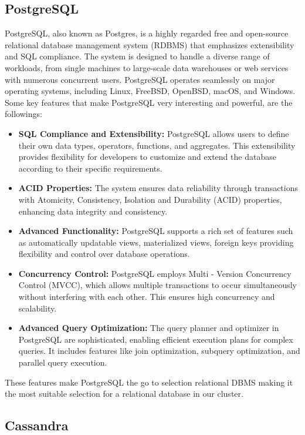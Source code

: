 \documentclass[conference]{IEEEtran}
\begin{document}
\subsection{PostgreSQL}

PostgreSQL, also known as Postgres, is a highly regarded free and open-source relational database management system (RDBMS) that emphasizes
extensibility and SQL compliance. The system is designed to handle a diverse range of workloads, from single machines to large-scale data warehouses 
or web services with numerous concurrent users. PostgreSQL operates seamlessly on major operating systems, including Linux, FreeBSD, OpenBSD, macOS, and Windows.
Some key features that make PostgreSQL very interesting and powerful, are the followings:

\begin{itemize}
    \item \textbf{SQL Compliance and Extensibility:} PostgreSQL allows users to define their own data types, operators, functions, and aggregates. This extensibility 
    provides flexibility for developers to customize and extend the database according to their specific requirements.
    \item \textbf{ACID Properties:} The system ensures data reliability through transactions with Atomicity, Consistency, Isolation and Durability
    (ACID) properties, enhancing data integrity and consistency.
    \item \textbf{Advanced Functionality:} PostgreSQL supports a rich set of features such as automatically updatable views, materialized views, foreign keys providing
    flexibility and control over database operations.
    \item \textbf{Concurrency Control:} PostgreSQL employs Multi - Version Concurrency Control (MVCC), which allows multiple transactions to occur simultaneously without interfering with each other. This ensures high concurrency and scalability.
    \item \textbf{Advanced Query Optimization:} The query planner and optimizer in PostgreSQL are sophisticated, enabling efficient execution plans for complex queries. 
    It includes features like join optimization, subquery optimization, and parallel query execution.
\end{itemize}

These features make PostgreSQL the go to selection relational DBMS making it the most suitable selection for a relational database in our cluster.

\subsection{Cassandra}
\end{document}
